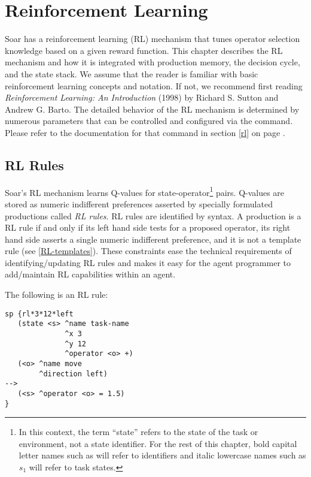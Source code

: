 \chapter{Reinforcement Learning}
\label{RL}

Soar has a reinforcement learning (RL) mechanism that tunes operator selection knowledge based on a given reward function.
This chapter describes the RL mechanism and how it is integrated with production memory, the decision cycle, and the state stack.
We assume that the reader is familiar with basic reinforcement learning concepts and notation. If not, we recommend first reading \emph{Reinforcement Learning: An Introduction} (1998) by Richard S. Sutton and Andrew G. Barto.
The detailed behavior of the RL mechanism is determined by numerous parameters that can be controlled and configured via the  command.
Please refer to the documentation for that command in section \ref{rl} on page \pageref{rl}.

\section{RL Rules}
\label{RL-rules}

Soar's RL mechanism learns Q-values for state-operator\footnote{In this context, the term ``state'' refers to the state of the task or environment, not a state identifier.
For the rest of this chapter, bold capital letter names such as  will refer to identifiers and italic lowercase names such as $s_1$ will refer to task states.} pairs.
Q-values are stored as numeric indifferent preferences asserted by specially formulated productions called \emph{RL rules}.
RL rules are identified by syntax.
A production is a RL rule if and only if its left hand side tests for a proposed operator, its right hand side asserts a single numeric indifferent preference, and it is not a template rule (see \ref{RL-templates}).
These constraints ease the technical requirements of identifying/updating RL rules and makes it easy for the agent programmer to add/maintain RL capabilities within an agent.

The following is an RL rule:

\begin{verbatim}
sp {rl*3*12*left
   (state <s> ^name task-name
              ^x 3
              ^y 12
	          ^operator <o> +)
   (<o> ^name move
	    ^direction left)
-->
   (<s> ^operator <o> = 1.5)
}
\end{verbatim}


